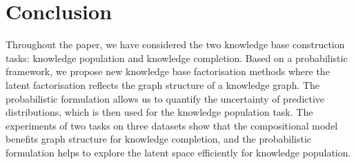 \section{Conclusion}
Throughout the paper, we have considered the two knowledge base construction tasks: knowledge population and knowledge completion.
Based on a probabilistic framework, we propose new knowledge base factorisation methods where the latent factorisation reflects the graph structure of a knowledge graph. The probabilistic formulation allows us to quantify the uncertainty of predictive distributions, which is then used for the knowledge population task. The experiments of two tasks on three datasets show that the compositional model benefits graph structure for knowledge completion, and the probabilistic formulation helps to explore the latent space efficiently for knowledge population.

